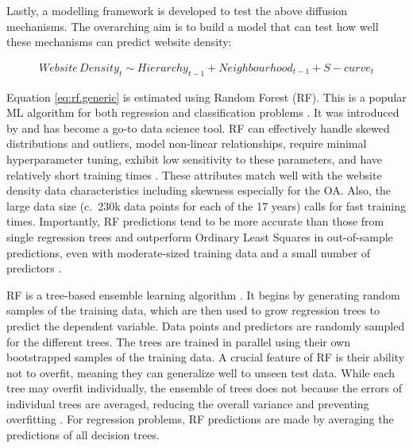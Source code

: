 \documentclass[
  authoryear,
  preprint,
  3p]{elsarticle}
\begin{document}
Lastly, a modelling framework is developed to test the above diffusion
mechanisms. The overarching aim is to build a model that can test how
well these mechanisms can predict website density:

\begin{align}
Website\,Density_{t} \sim Hierarchy_{t-1} + Neighbourhood_{t-1} + S-curve_{t}\label{eq:rf.generic}
\end{align}

\noindent Equation \ref{eq:rf.generic} is estimated using Random Forest
(RF). This is a popular ML algorithm for both regression and
classification problems \citep{biau2012analysis}. It was introduced by
\citet{breiman2001random} and has become a go-to data science tool. RF
can effectively handle skewed distributions and outliers, model
non-linear relationships, require minimal hyperparameter tuning, exhibit
low sensitivity to these parameters, and have relatively short training
times \citep{Caruana2008, liaw2002classification, yan2020using}. These
attributes match well with the website density data characteristics
including skewness especially for the OA. Also, the large data size
(c.~230k data points for each of the 17 years) calls for fast training
times. Importantly, RF predictions tend to be more accurate than those
from single regression trees and outperform Ordinary Least Squares in
out-of-sample predictions, even with moderate-sized training data and a
small number of predictors
\citep{mullainathan2017machine, athey2019machine, sulaiman2011intelligent, pourebrahim2019trip, biau2012analysis}.

RF is a tree-based ensemble learning algorithm
\citep{breiman2001random}. It begins by generating random samples of the
training data, which are then used to grow regression trees to predict
the dependent variable. Data points and predictors are randomly sampled
for the different trees. The trees are trained in parallel using their
own bootstrapped samples of the training data. A crucial feature of RF
is their ability not to overfit, meaning they can generalize well to
unseen test data. While each tree may overfit individually, the ensemble
of trees does not because the errors of individual trees are averaged,
reducing the overall variance and preventing overfitting
\citep{last2002improving}. For regression problems, RF predictions are
made by averaging the predictions of all decision trees.
\end{document}
